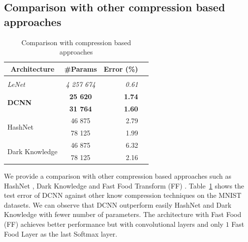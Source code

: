 \subsection{Comparison with other compression based approaches}
\label{subsection:ch3-comparison_with_other_compression_based_approaches}


\begin{table}
  \centering
    \caption{Comparison with compression based approaches}
    \begin{tabular}{lcrc}
    \toprule
    \multicolumn{1}{c}{\textbf{Architecture}} & \multicolumn{1}{c}{\textbf{\#Params}} & \textbf{Error (\%)} \\
    \hline \\
    \textit{LeNet \cite{Lecun98gradient-basedlearning}} & \textit{4 257 674} & \textit{0.61} \\
    \multirow{2}[0]{*}{\textbf{DCNN}} & \textbf{25 620} & \textbf{1.74} \\
          & \textbf{31 764} & \textbf{1.60} \\
    \multirow{2}[0]{*}{HashNet \cite{Chen_Hashing_Trick}} & 46 875 & 2.79 \\
          &  78 125 & 1.99 \\
    \multirow{2}[0]{*}{Dark Knowledge \cite{44873}} & 46 875 & 6.32 \\
          &  78 125 & 2.16 \\
    \bottomrule
    \end{tabular}%
  \label{tab:mnist}%
\end{table}%


We provide a comparison with other compression based approaches such as HashNet \cite{Chen_Hashing_Trick}, Dark Knowledge \cite{44873} and Fast Food Transform (FF) \cite{7410530}. 
Table~\ref{tab:mnist} shows the test error of DCNN against other know compression techniques on the MNIST datasets. We can observe that DCNN outperform easily HashNet \cite{Chen_Hashing_Trick} and Dark Knowledge \cite{44873} with fewer number of parameters. The architecture with Fast Food (FF) \cite{7410530} achieves better performance but with convolutional layers and only $1$ Fast Food Layer as the last Softmax layer. 



